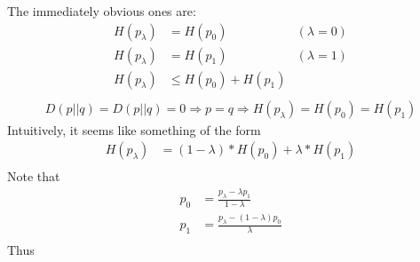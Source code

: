 \documentclass{article}
\begin{document}
The immediately obvious ones are:
\begin{align*}
H(p_{\lambda}) &= H(p_0) & (\lambda = 0)\\
H(p_{\lambda}) &= H(p_1) & (\lambda = 1)\\
H(p_{\lambda}) &\leq H(p_0) + H(p_1) \\
\end{align*}
\begin{align*}
D(p||q) = D(p||q) = 0 \Rightarrow p = q \Rightarrow H(p_{\lambda}) = H(p_0) = H(p_1)
\end{align*}
Intuitively, it seems like something of the form
\begin{align*}
H(p_{\lambda}) &= (1-\lambda)*H(p_0) + \lambda*H(p_1)\\
\end{align*}
Note that
\begin{align*}
p_0 &= \frac{p_\lambda - \lambda p_1}{1- \lambda}\\
p_1 &= \frac{p_\lambda - (1-\lambda)p_0}{\lambda}\\
\end{align*}
Thus
\end{document}
